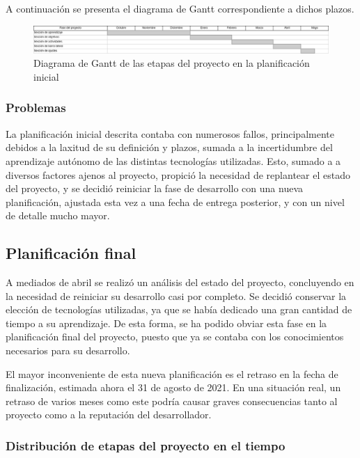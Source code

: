 \documentclass[10pt, a4paper]{aqademic}
\begin{document}
\medskip

A continuación se presenta el diagrama de Gantt correspondiente a dichos plazos. 

\begin{figure}[h]
	\centering
	\includegraphics[scale=0.35]{img/old_Gantt.png}
	\caption{Diagrama de Gantt de las etapas del proyecto en la planificación inicial}
\end{figure}

\subsubsection{Problemas}

La planificación inicial descrita contaba con numerosos fallos, principalmente debidos a la laxitud de su definición y plazos, sumada a la incertidumbre del aprendizaje autónomo de las distintas tecnologías utilizadas. Esto, sumado a a diversos factores ajenos al proyecto, propició la necesidad de replantear el estado del proyecto, y se decidió reiniciar la fase de desarrollo con una nueva planificación, ajustada esta vez a una fecha de entrega posterior, y con un nivel de detalle mucho mayor.

\subsection{Planificación final}

A mediados de abril se realizó un análisis del estado del proyecto, concluyendo en la necesidad de reiniciar su desarrollo casi por completo. Se decidió conservar la elección de tecnologías utilizadas, ya que se había dedicado una gran cantidad de tiempo a su aprendizaje. De esta forma, se ha podido obviar esta fase en la planificación final del proyecto, puesto que ya se contaba con los conocimientos necesarios para su desarrollo.

El mayor inconveniente de esta nueva planificación es el retraso en la fecha de finalización, estimada ahora el 31 de agosto de 2021. En una situación real, un retraso de varios meses como este podría causar graves consecuencias tanto al proyecto como a la reputación del desarrollador.

\subsubsection*{Distribución de etapas del proyecto en el tiempo}
\end{document}
